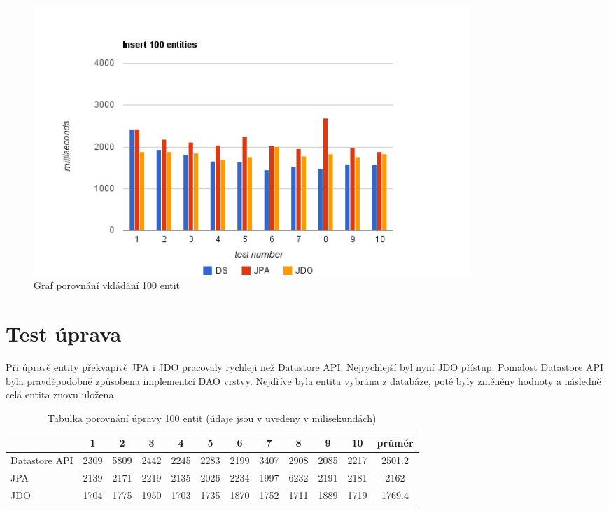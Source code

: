\begin{figure}[h]
\begin{center}
\includegraphics[width=6.5in]{figures/insert.png}
\caption{Graf porovnání vkládání 100 entit}
\label{fig:insert}
\end{center}
\end{figure}

\section{Test úprava}

Při úpravě entity překvapivě JPA i JDO pracovaly rychleji než Datastore API. Nejrychlejší byl nyní JDO přístup. Pomalost Datastore API byla pravděpodobně způsobena implementcí DAO vrstvy. Nejdříve byla entita vybrána z databáze, poté byly změněny hodnoty a následně celá entita znovu uložena.

\begin{table}[h]
\centering
\caption{Tabulka porovnání úpravy 100 entit (údaje jsou v uvedeny v milisekundách)}\label{tab:update}
\begin{tabular}{|l|c|c|c|c|c|c|c|c|c|c|c|}
   \hline
	& 1		& 2		& 3		& 4		& 5		& 6		& 7		& 8		& 9		& 10		& průměr \\
   \hline
Datastore API	& 2309	& 5809	& 2442	& 2245	& 2283	& 2199	& 3407	& 2908	& 2085	& 2217	& 2501.2 \\
JPA	& 2139	& 2171	& 2219	& 2135	& 2026	& 2234	& 1997	& 6232	& 2191	& 2181	& 2162 \\
JDO	& 1704	& 1775	& 1950	& 1703	& 1735	& 1870	& 1752	& 1711	& 1889	& 1719	& 1769.4 \\
   \hline
\end{tabular}
\end{table}

